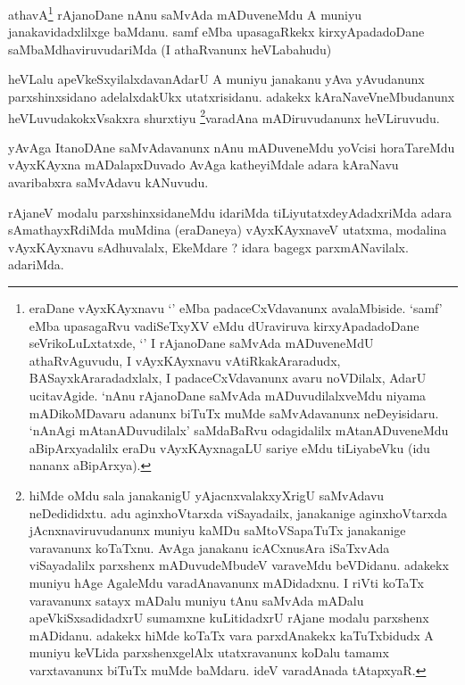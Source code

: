 \begin{artha}
athavA\footnote{eraDane vAyxKAyxnavu `\stext' eMba padaceCxVdavanunx avalaMbiside. `samf' eMba upasagaRvu vadiSeTxyXV eMdu dUraviruva kirxyApadadoDane seVrikoLuLxtatxde, `\stext' I rAjanoDane saMvAda mADuveneMdU athaRvAguvudu, I vAyxKAyxnavu vAtiRkakAraradudx, BASayxkAraradadxlalx, I padaceCxVdavanunx avaru noVDilalx, AdarU ucitavAgide. `nAnu rAjanoDane saMvAda mADuvudilalxveMdu niyama mADikoMDavaru adanunx biTuTx muMde saMvAdavanunx neDeyisidaru. `nAnAgi mAtanADuvudilalx' saMdaBaRvu odagidalilx mAtanADuveneMdu aBipArxyadalilx eraDu vAyxKAyxnagaLU sariye eMdu tiLiyabeVku (idu nananx aBipArxya).} rAjanoDane nAnu saMvAda mADuveneMdu A muniyu janakavidadxlilxge baMdanu. samf eMba upasagaRkekx kirxyApadadoDane saMbaMdhaviruvudariMda (I athaRvanunx heVLabahudu) 
\end{artha}


\begin{artha}
heVLalu apeVkeSxyilalxdavanAdarU A muniyu janakanu yAva yAvudanunx parxshinxsidano adelalxdakUkx utatxrisidanu. adakekx kAraNaveVneMbudanunx heVLuvudakokxVsakxra shurxtiyu \footnote{hiMde oMdu sala janakanigU yAjacnxvalakxyXrigU saMvAdavu neDedididxtu. adu aginxhoVtarxda viSayadailx, janakanige aginxhoVtarxda jAcnxnaviruvudanunx muniyu kaMDu saMtoVSapaTuTx janakanige varavanunx koTaTxnu. AvAga janakanu icACxnusAra iSaTxvAda viSayadalilx parxshenx mADuvudeMbudeV varaveMdu beVDidanu. adakekx muniyu hAge AgaleMdu varadAnavanunx mADidadxnu. I riVti koTaTx varavanunx satayx mADalu muniyu tAnu saMvAda mADalu apeVkiSxsadidadxrU sumamxne kuLitidadxrU rAjane modalu parxshenx mADidanu. adakekx hiMde koTaTx vara parxdAnakekx kaTuTxbidudx A muniyu keVLida parxshenxgelAlx utatxravanunx koDalu tamamx varxtavanunx biTuTx muMde baMdaru. ideV varadAnada tAtapxyaR.}varadAna mADiruvudanunx heVLiruvudu.
\end{artha}

\begin{artha}
yAvAga ItanoDAne saMvAdavanunx nAnu mADuveneMdu yoVcisi horaTareMdu vAyxKAyxna mADalapxDuvado AvAga katheyiMdale adara kAraNavu avaribabxra saMvAdavu kANuvudu.
\end{artha}


\begin{artha}
rAjaneV modalu parxshinxsidaneMdu idariMda tiLiyutatxdeyAdadxriMda adara sAmathayxRdiMda muMdina (eraDaneya) vAyxKAyxnaveV utatxma, modalina vAyxKAyxnavu sAdhuvalalx, EkeMdare ? idara bagegx parxmANavilalx. adariMda.
\end{artha}

